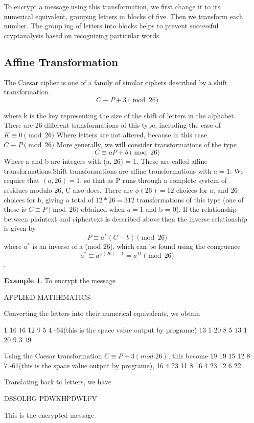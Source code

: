 \documentclass{report}
\theoremstyle{definition}
\newtheorem{exmp}{Example}[section]
\begin{document}
{{\Large{To encrypt a message using this transformation, we first change it to its numerical
equivalent, grouping letters in blocks of five. Then we transform each number. The group­
ing of letters into blocks helps to prevent successful cryptanalysis based on recognizing
particular words.}
\subsection{Affine Transformation}
\Large{The Caesar cipher is one of a family of similar ciphers described by a shift transformation.
$$C \equiv P+3\pmod{26}$$

where k is the key representing the size of the shift of letters in the alphabet. There are
26 different transformations of this type, including the case of $K\equiv 0\pmod{26}$
Where letters are not altered, because in this case $C \equiv P\pmod{26}$ More generally, we will consider transformations of the type 
$$C \equiv aP+b\pmod{26}$$ 
Where a and b are integers with (a, 26) = 1. These are called affine transformations.Shift transformations are affine transformations with $a= 1$. We require that $(a, 26) = 1$,
so that as P runs through a complete system of residues modulo 26, C also does. There
are $\phi(26) = 12$ choices for a, and 26 choices for b, giving a total of $12*26 = 312$
transformations of this type (one of these is $C \equiv P\pmod{26}$ obtained when $a = 1$ and
b = 0). If the relationship between plaintext and ciphertext is described above then the inverse relationship is given by
$$P \equiv a^*(C-b)\pmod{26}$$ 
where $a^*$ is an inverse of a (mod 26), which can be found using the congruence $$a^* \equiv a^{\phi(26)-1} =a^{11}\pmod{26}$$.
\begin{exmp}
To encrypt the message
\begin{center}
\LARGE{APPLIED MATHEMATICS} 
\end{center}
Converting the letters into their numerical equivalents, we obtain\newline

1 16 16 12 9 5 4 -64(this is the space value output by programe) 13 1 20 8 5 13 1 20 9 3 19\newline

Using the Caesar transformation $C\equiv P+3 (mod \;26)$, this become  19  19  15  12  8  7  -61(this is the space value output by programe), 16  4  23  11  8  16  4  23 12 6 22 \newline

Translating back to letters, we have\newline
\begin{center}
\LARGE{DSSOLHG PDWKHPDWLFV} \newline
\end{center}
This is the encrypted message.
\end{exmp}

}}}
\end{document}
